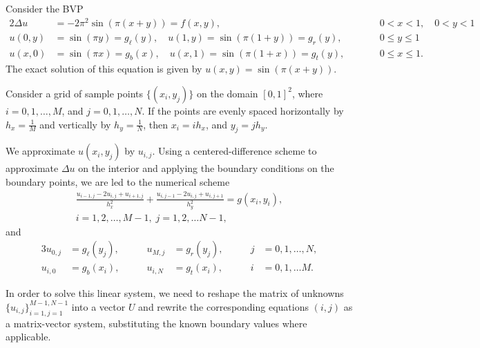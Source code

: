 \documentclass{homework}
\begin{document}
	\maketitle
	
	\question Consider the BVP
	\begin{alignat*}{2}
		\Delta u &= -2\pi^2\sin(\pi(x+y)) = f(x,y), &\qquad &0<x<1, \quad 0<y<1 \\
		u(0,y) &= \sin(\pi y) = g_\ell(y), \quad u(1, y) = \sin(\pi(1+y)) = g_r(y), & \qquad &0 \le y \le 1\\
		u(x,0) &= \sin(\pi x) = g_b(x), \quad u(x, 1) = \sin(\pi(1+x)) = g_t(y), & \qquad &0 \le x \le 1. 
	\end{alignat*}
	The exact solution of this equation is given by $u(x,y) = \sin(\pi(x+y))$.
	
	\begin{alphaparts}
		\questionpart Consider a grid of sample points $\{(x_i, y_j)\}$ on the domain $[0,1]^2$, where $i = 0,1,\dots, M$, and $j = 0,1,\dots, N$. If the points are evenly spaced horizontally by $h_x = \frac{1}{M}$ and vertically by $h_y = \frac{1}{N}$, then $x_i = ih_x$, and $y_j = jh_y$.
		
		We approximate $u(x_i,y_j)$ by $u_{i,j}$. Using a centered-difference scheme to approximate $\Delta u$ on the interior and applying the boundary conditions on the boundary points, we are led to the numerical scheme
		\begin{equation*}
			\tag{$i,j$}
			\begin{split}
				\frac{u_{i-1,j} - 2u_{i,j} + u_{i+1,j}}{h_x^2} + \frac{u_{i,j-1} -2 u_{i,j} + u_{i,j+1}}{h_y^2} = g(x_i, y_i),\\  i=1,2,\dots, M-1,\; j=1,2,\dots N-1,
			\end{split}
		\end{equation*}
		and
		\begin{alignat*}{3}
			u_{0,j} &= g_\ell(y_j),& \qquad u_{M,j} &= g_r(y_j),& \qquad j&=0,1,\dots,N,\\
			u_{i,0} &= g_b(x_i), & \qquad u_{i,N} &= g_t(x_i),& \qquad i&=0,1,\dots M.
		\end{alignat*}
		
		
		
		In order to solve this linear system, we need to reshape the matrix of unknowns $\{u_{i,j}\}_{i=1,j=1}^{M-1,N-1}$ into a vector $U$ and rewrite the corresponding equations $(i,j)$ as a matrix-vector system, substituting the known boundary values where applicable.
		

\end{alphaparts}
\end{document}
